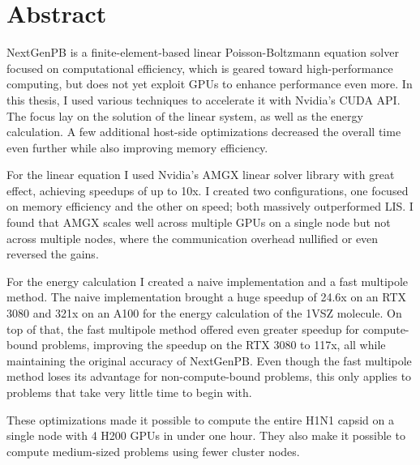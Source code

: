 \chapter*{Abstract}

NextGenPB is a finite-element-based linear Poisson-Boltzmann equation solver focused on computational efficiency, which is geared toward high-performance computing, but does not yet exploit GPUs to enhance performance even more.
In this thesis, I used various techniques to accelerate it with Nvidia's CUDA API.
The focus lay on the solution of the linear system, as well as the energy calculation.
A few additional host-side optimizations decreased the overall time even further while also improving memory efficiency.

For the linear equation I used Nvidia's AMGX linear solver library with great effect, achieving speedups of up to 10x.
I created two configurations, one focused on memory efficiency and the other on speed; both massively outperformed LIS.
I found that AMGX scales well across multiple GPUs on a single node but not across multiple nodes, where the communication overhead nullified or even reversed the gains.

For the energy calculation I created a naive implementation and a fast multipole method.
The naive implementation brought a huge speedup of 24.6x on an RTX 3080 and 321x on an A100 for the energy calculation of the 1VSZ molecule.
On top of that, the fast multipole method offered even greater speedup for compute-bound problems, improving the speedup on the RTX 3080 to 117x, all while maintaining the original accuracy of NextGenPB.
Even though the fast multipole method loses its advantage for non-compute-bound problems, this only applies to problems that take very little time to begin with.

These optimizations made it possible to compute the entire H1N1 capsid on a single node with 4 H200 GPUs in under one hour.
They also make it possible to compute medium-sized problems using fewer cluster nodes.
